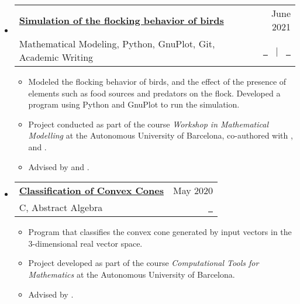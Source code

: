 \documentclass[a4paper,10pt]{article}
\makeatletter
\newcommand{\resumeItemListEnd}{\end{itemize}}
\newcommand{\resumeQuadHeading}[4]{
  \item
  \begin{tabular*}{0.96\textwidth}[t]{l@{\extracolsep{\fill}}r}
    \textbf{#1} & \small #2 \\
    \small#3 & \small #4 \\
  \end{tabular*}
}
\newcommand{\resumeHeadingListStart}{
  \begin{itemize}[leftmargin=0.15in, label={}]
}
\newcommand{\resumeHeadingListEnd}{\end{itemize}}
\makeatother
\begin{document}
  \resumeHeadingListStart{}
    \resumeQuadHeading{\href{https://github.com/loredanasandu/bird-flocks-simulation}{Simulation of the flocking behavior of birds}}{June 2021}{Mathematical Modeling, Python, GnuPlot, Git, Academic Writing}{\href{https://github.com/loredanasandu/bird-flocks-simulation/blob/main/report.pdf}{\faFileTextO \ \graydotuline{{Report \scriptsize (in Catalan)}}} \ $|$ \ \href{https://github.com/loredanasandu/bird-flocks-simulation}{\faGithub \ \graydotuline{Code}}}
    \begin{itemize}[leftmargin=3em, itemsep=0.1em, topsep=2pt]
      \item \small Modeled the flocking behavior of birds, and the effect of the presence of elements such as food sources and predators on the flock. Developed a program using Python and GnuPlot to run the simulation.
      \item \small Project conducted as part of the course \textit{Workshop in Mathematical Modelling} at the Autonomous University of Barcelona, co-authored with \href{https://www.linkedin.com/in/anna-danot-14a10b252}{}, \href{https://www.linkedin.com/in/nuria-fernandez-raventos/}{} and \href{https://www.linkedin.com/in/jan-mousavi-facundo/}{}.
      \item \small Advised by \href{https://mat.uab.cat/departament/uab/pop_ex.php?id=172&lang=cat}{} and \href{https://mat.uab.cat/departament/uab/pop_ex.php?id=208&lang=}{}.
    \end{itemize}
  \resumeHeadingListEnd{}

  \resumeHeadingListStart{}
    \resumeQuadHeading{\href{https://github.com/loredanasandu/cone-classification}{Classification of Convex Cones}}{May 2020}{C, Abstract Algebra}{\href{https://github.com/loredanasandu/cone-classification}{\faGithub \ \graydotuline{Source code}}}
    \begin{itemize}[leftmargin=3em, itemsep=0.1em, topsep=2pt]
      \item \small Program that classifies the convex cone generated by input vectors in the 3-dimensional real vector space.
      \item \small Project developed as part of the course \textit{Computational Tools for Mathematics} at the Autonomous University of Barcelona.
      \item \small Advised by \href{https://mat.uab.cat/geoarit/index.php/people?controller=member&view=member&id=1}{}.
    \end{itemize}
  \resumeItemListEnd{}
\end{document}
